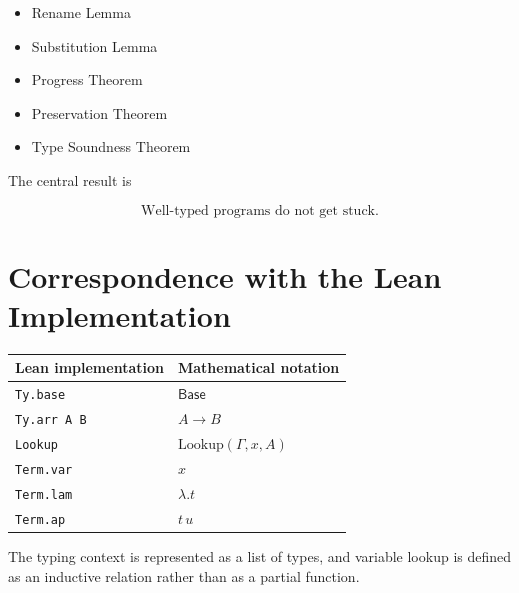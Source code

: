\documentclass[a4paper,11pt]{article}
\begin{document}
    \begin{itemize}
        \item Rename Lemma
        \item Substitution Lemma
        \item Progress Theorem
        \item Preservation Theorem
        \item Type Soundness Theorem
    \end{itemize}

    The central result is

    \[
        \text{Well-typed programs do not get stuck.}
    \]

    \section{Correspondence with the Lean Implementation}

    \begin{center}
        \begin{tabular}{ll}
            \toprule
            Lean implementation & Mathematical notation \\
            \midrule
            \texttt{Ty.base} & $\mathsf{Base}$ \\
            \texttt{Ty.arr A B} & $A \rightarrow B$ \\
            \texttt{Lookup} & $\mathrm{Lookup}(\Gamma,x,A)$ \\
            \texttt{Term.var} & $x$ \\
            \texttt{Term.lam} & $\lambda.t$ \\
            \texttt{Term.ap} & $t\,u$ \\
            \bottomrule
        \end{tabular}
    \end{center}

    The typing context is represented as a list of types, and
    variable lookup is defined as an inductive relation rather
    than as a partial function.
\end{document}
